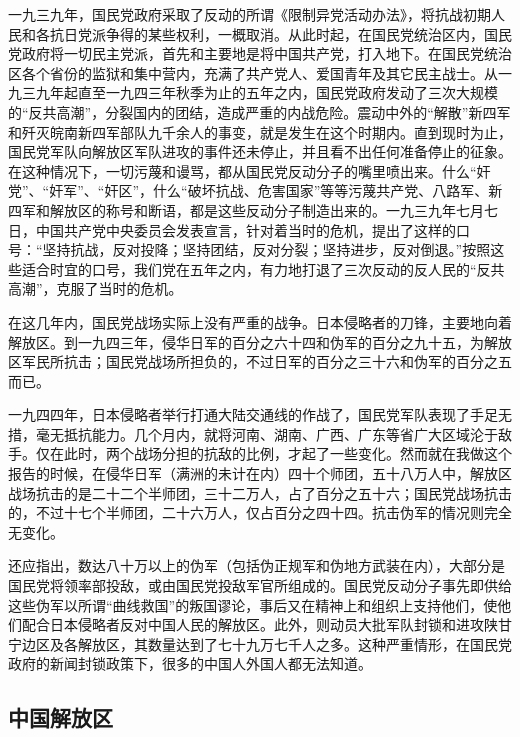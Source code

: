 一九三九年，国民党政府采取了反动的所谓《限制异党活动办法》，将抗战初期人民和各抗日党派争得的某些权利，一概取消。从此时起，在国民党统治区内，国民党政府将一切民主党派，首先和主要地是将中国共产党，打入地下。在国民党统治区各个省份的监狱和集中营内，充满了共产党人、爱国青年及其它民主战士。从一九三九年起直至一九四三年秋季为止的五年之内，国民党政府发动了三次大规模的“反共高潮”，分裂国内的团结，造成严重的内战危险。震动中外的“解散”新四军和歼灭皖南新四军部队九千余人的事变，就是发生在这个时期内。直到现时为止，国民党军队向解放区军队进攻的事件还未停止，并且看不出任何准备停止的征象。在这种情况下，一切污蔑和谩骂，都从国民党反动分子的嘴里喷出来。什么“奸党”、“奸军”、“奸区”，什么“破坏抗战、危害国家”等等污蔑共产党、八路军、新四军和解放区的称号和断语，都是这些反动分子制造出来的。一九三九年七月七日，中国共产党中央委员会发表宣言，针对着当时的危机，提出了这样的口号：“坚持抗战，反对投降；坚持团结，反对分裂；坚持进步，反对倒退。”按照这些适合时宜的口号，我们党在五年之内，有力地打退了三次反动的反人民的“反共高潮”，克服了当时的危机。

在这几年内，国民党战场实际上没有严重的战争。日本侵略者的刀锋，主要地向着解放区。到一九四三年，侵华日军的百分之六十四和伪军的百分之九十五，为解放区军民所抗击；国民党战场所担负的，不过日军的百分之三十六和伪军的百分之五而已。

一九四四年，日本侵略者举行打通大陆交通线的作战了，国民党军队表现了手足无措，毫无抵抗能力。几个月内，就将河南、湖南、广西、广东等省广大区域沦于敌手。仅在此时，两个战场分担的抗敌的比例，才起了一些变化。然而就在我做这个报告的时候，在侵华日军（满洲的未计在内）四十个师团，五十八万人中，解放区战场抗击的是二十二个半师团，三十二万人，占了百分之五十六；国民党战场抗击的，不过十七个半师团，二十六万人，仅占百分之四十四。抗击伪军的情况则完全无变化。

还应指出，数达八十万以上的伪军（包括伪正规军和伪地方武装在内），大部分是国民党将领率部投敌，或由国民党投敌军官所组成的。国民党反动分子事先即供给这些伪军以所谓“曲线救国”的叛国谬论，事后又在精神上和组织上支持他们，使他们配合日本侵略者反对中国人民的解放区。此外，则动员大批军队封锁和进攻陕甘宁边区及各解放区，其数量达到了七十九万七千人之多。这种严重情形，在国民党政府的新闻封锁政策下，很多的中国人外国人都无法知道。

\subsection{中国解放区}

